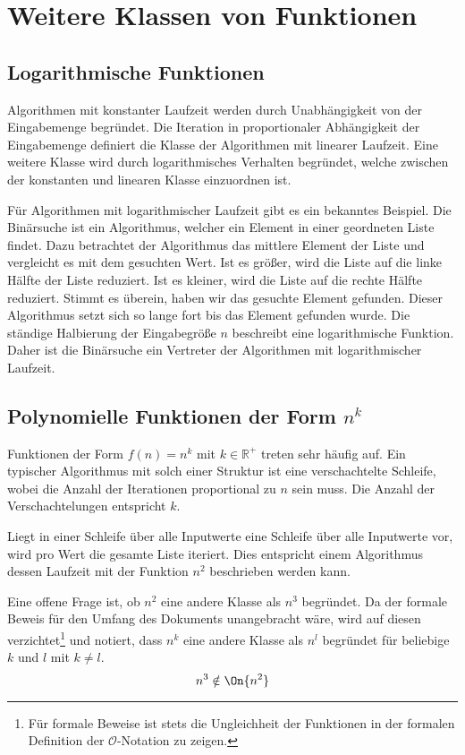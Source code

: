 \section{Weitere Klassen von Funktionen}
%
\subsection{Logarithmische Funktionen}
%
Algorithmen mit konstanter Laufzeit werden durch Unabhängigkeit von der Eingabemenge begründet. Die Iteration in proportionaler Abhängigkeit der Eingabemenge definiert die Klasse der Algorithmen mit linearer Laufzeit. Eine weitere Klasse wird durch logarithmisches Verhalten begründet, welche zwischen der konstanten und linearen Klasse einzuordnen ist.

Für Algorithmen mit logarithmischer Laufzeit gibt es ein bekanntes Beispiel. Die Binärsuche ist ein Algorithmus, welcher ein Element in einer geordneten Liste findet. Dazu betrachtet der Algorithmus das mittlere Element der Liste und vergleicht es mit dem gesuchten Wert. Ist es größer, wird die Liste auf die linke Hälfte der Liste reduziert. Ist es kleiner, wird die Liste auf die rechte Hälfte reduziert. Stimmt es überein, haben wir das gesuchte Element gefunden. Dieser Algorithmus setzt sich so lange fort bis das Element gefunden wurde. Die ständige Halbierung der Eingabegröße $n$ beschreibt eine logarithmische Funktion. Daher ist die Binärsuche ein Vertreter der Algorithmen mit logarithmischer Laufzeit.
%
\subsection{Polynomielle Funktionen der Form $n^k$}
%
Funktionen der Form $f(n) = n^k$ mit $k \in \mathbb{R}^+$ treten sehr häufig auf. Ein typischer Algorithmus mit solch einer Struktur ist eine verschachtelte Schleife, wobei die Anzahl der Iterationen proportional zu $n$ sein muss. Die Anzahl der Verschachtelungen entspricht $k$.

Liegt in einer Schleife über alle Inputwerte eine Schleife über alle Inputwerte vor, wird pro Wert die gesamte Liste iteriert. Dies entspricht einem Algorithmus dessen Laufzeit mit der Funktion $n^2$ beschrieben werden kann.

Eine offene Frage ist, ob $n^2$ eine andere Klasse als $n^3$ begründet. Da der formale Beweis für den Umfang des Dokuments unangebracht wäre, wird auf diesen verzichtet\footnote{Für formale Beweise ist stets die Ungleichheit der Funktionen in der formalen Definition der $\mathcal{O}$-Notation zu zeigen.} und notiert, dass $n^k$ eine andere Klasse als $n^l$ begründet für beliebige $k$ und $l$ mit $k \neq l$.
\[
  n^3 \notin \On{n^2}
\]
%
